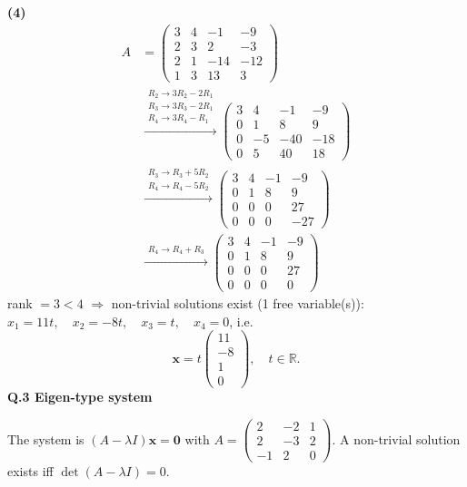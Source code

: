 \noindent\textbf{(4)}
\begin{align*}
A &= \begin{pmatrix}3 & 4 & -1 & -9 \\ 2 & 3 & 2 & -3 \\ 2 & 1 & -14 & -12 \\ 1 & 3 & 13 & 3\end{pmatrix} \\
&\xrightarrow{\substack{R_2\to 3R_2-2R_1\\ R_3\to 3R_3-2R_1\\ R_4\to 3R_4-R_1}} \begin{pmatrix}3 & 4 & -1 & -9 \\ 0 & 1 & 8 & 9 \\ 0 & -5 & -40 & -18 \\ 0 & 5 & 40 & 18\end{pmatrix} \\
&\xrightarrow{\substack{R_3\to R_3+5R_2\\ R_4\to R_4-5R_2}} \begin{pmatrix}3 & 4 & -1 & -9 \\ 0 & 1 & 8 & 9 \\ 0 & 0 & 0 & 27 \\ 0 & 0 & 0 & -27\end{pmatrix} \\
&\xrightarrow{\substack{R_4\to R_4+R_3}} \begin{pmatrix}3 & 4 & -1 & -9 \\ 0 & 1 & 8 & 9 \\ 0 & 0 & 0 & 27 \\ 0 & 0 & 0 & 0\end{pmatrix}
\end{align*}
rank $=3<4$ $\Rightarrow$ non-trivial solutions exist (1 free variable(s)): $x_1=11 t, \quad x_2=- 8 t, \quad x_3=t, \quad x_4=0$, i.e. \[ \mathbf{x}=t\begin{pmatrix}11 \\ -8 \\ 1 \\ 0\end{pmatrix}, \quad t\in\mathbb{R}. \]
\medskip\noindent\textbf{Q.3  Eigen-type system}\par\smallskip
The system is $(A-\lambda I)\mathbf{x}=\mathbf 0$ with $A=\begin{pmatrix}2&-2&1\\2&-3&2\\-1&2&0\end{pmatrix}$. A non-trivial solution exists iff $\det(A-\lambda I)=0$.
